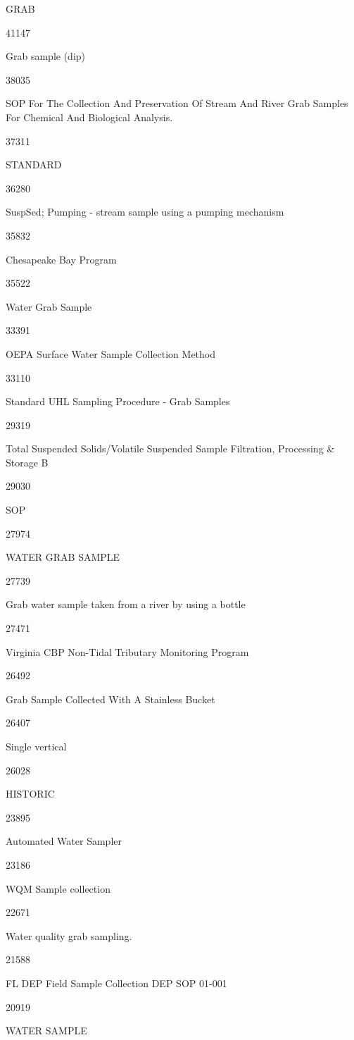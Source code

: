 \documentclass[]{article}
\begin{document}
GRAB

41147

Grab sample (dip)

38035

SOP For The Collection And Preservation Of Stream And River Grab Samples
For Chemical And Biological Analysis.

37311

STANDARD

36280

SuspSed; Pumping - stream sample using a pumping mechanism

35832

Chesapeake Bay Program

35522

Water Grab Sample

33391

OEPA Surface Water Sample Collection Method

33110

Standard UHL Sampling Procedure - Grab Samples

29319

Total Suspended Solids/Volatile Suspended Sample Filtration, Processing
\& Storage B

29030

SOP

27974

WATER GRAB SAMPLE

27739

Grab water sample taken from a river by using a bottle

27471

Virginia CBP Non-Tidal Tributary Monitoring Program

26492

Grab Sample Collected With A Stainless Bucket

26407

Single vertical

26028

HISTORIC

23895

Automated Water Sampler

23186

WQM Sample collection

22671

Water quality grab sampling.

21588

FL DEP Field Sample Collection DEP SOP 01-001

20919

WATER SAMPLE
\end{document}
